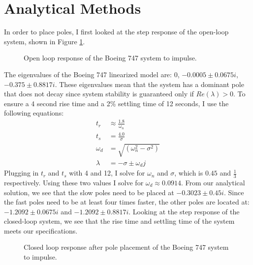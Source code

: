 \section{Analytical Methods} \label{sec:methods}


In order to place poles, I first looked at the step response of the
open-loop system, shown in Figure \ref{fig:openloop}.
\begin{figure}[h]
  \caption{Open loop response of the Boeing 747 system to impulse.}
  \label{fig:openloop}
\end{figure}
The eigenvalues
of the Boeing 747 linearized model are: 0, $-0.0005 \pm 0.0675i$, $-0.375 \pm
0.8817i$. These eigenvalues mean that the system has a dominant pole
that does not decay since system stability is guaranteed only if
$Re(\lambda) > 0$. To ensure a 4 second rise time and a 2\% settling time of
12 seconds, I use the following equations:
\begin{align}
  t_r &\approx \frac{1.8}{\omega_n} \\
  t_s &= \frac{4.0}{\sigma} \\
  \omega_d &= \sqrt{\left( \omega_n^2 - \sigma^2 \right)} \\
  \lambda &= -\sigma \pm \omega_dj 
\end{align}
Plugging in $t_{r}$ and $t_{s}$ with 4 and 12, I solve for $\omega_n$
and $\sigma$, which is $0.45$ and $\frac{1}{3}$ respectively. Using
these two values I solve for $\omega_d \approx 0.0914$. From our
analytical solution, we see that the slow poles need to be placed at
$-0.3023 \pm 0.45i$. Since the fast poles need to be at least four
times faster, the other poles are located at: $-1.2092 \pm 0.0675i$
and $-1.2092 \pm 0.8817i$. Looking at the step response of the
closed-loop system, we see that the rise time and settling time of the
system meets our specifications. 
\begin{figure}[h]
  \caption{Closed loop response after pole placement of the Boeing 747 system to impulse.}
  \label{fig:closeloop}
\end{figure}
